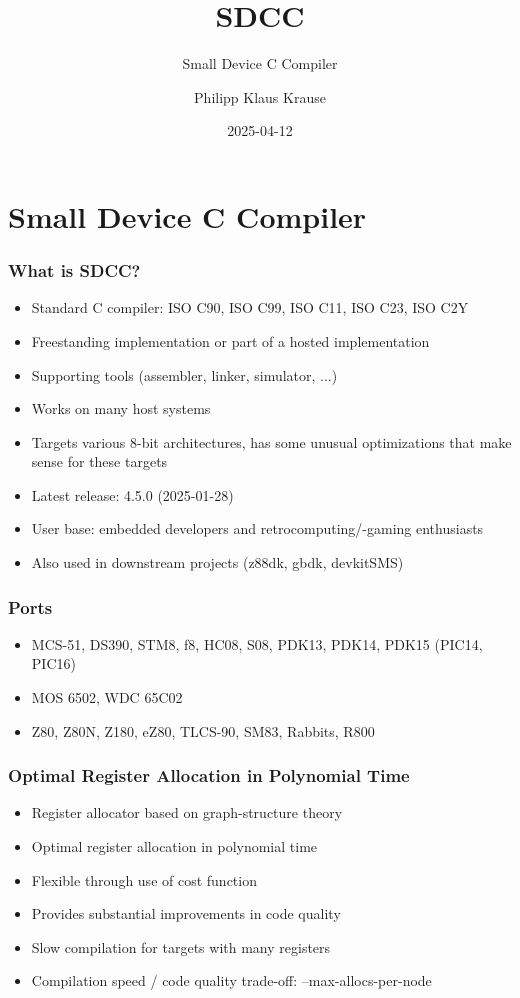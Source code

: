 \documentclass[xcolor=dvipsnames]{beamer}
\title{SDCC}
\subtitle{Small Device C Compiler}
\date{2025-04-12}
\author{Philipp Klaus Krause}
\begin{document}
\begin{frame}
	\titlepage
\end{frame}

\section{Small Device C Compiler}

\begin{frame}
	\frametitle{What is SDCC?}
	\begin{itemize}
		\item Standard C compiler: ISO C90, ISO C99, ISO C11, ISO C23, ISO C2Y
		\item Freestanding implementation or part of a hosted implementation
		\item Supporting tools (assembler, linker, simulator, ...)
		\item Works on many host systems
		\item Targets various 8-bit architectures, has some unusual optimizations that make sense for these targets
		\item Latest release: 4.5.0 (2025-01-28)
		\item User base: embedded developers and retrocomputing/-gaming enthusiasts
		\item Also used in downstream projects (z88dk, gbdk, devkitSMS)
	\end{itemize}
\end{frame}

\begin{frame}
	\frametitle{Ports}
	\begin{itemize}
		\item MCS-51, DS390, STM8, f8, HC08, S08, PDK13, PDK14, PDK15 (PIC14, PIC16)
		\item MOS 6502, WDC 65C02
		\item Z80, Z80N, Z180, eZ80, TLCS-90, SM83, Rabbits, R800
	\end{itemize}
\end{frame}

\begin{frame}
	\frametitle{Optimal Register Allocation in Polynomial Time}
	\begin{itemize}
		\item Register allocator based on graph-structure theory
		\item Optimal register allocation in polynomial time
		\item Flexible through use of cost function
		\item Provides substantial improvements in code quality
		\item Slow compilation for targets with many registers
		\item Compilation speed / code quality trade-off: --max-allocs-per-node
	\end{itemize}
\end{frame}
\end{document}

